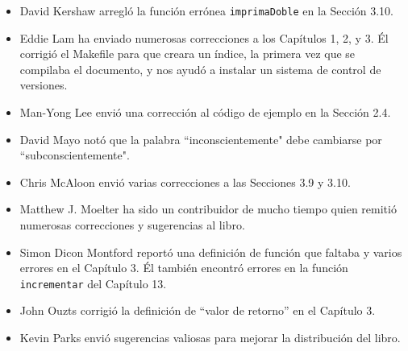 \begin{itemize}
\item David Kershaw arregló la función errónea \texttt{imprimaDoble} en 
la Sección 3.10.


\item Eddie Lam ha enviado numerosas correcciones a los Capítulos 1, 2, y 3.  Él
corrigió el Makefile para que creara un índice, la primera vez
que se compilaba el documento, y  nos ayudó a instalar un sistema
de control de versiones.


\item Man-Yong Lee envió una corrección al código de ejemplo en la
Sección 2.4.  


\item David Mayo notó que la palabra ``inconscientemente"
debe cambiarse por  ``subconscientemente".


\item Chris McAloon envió varias correcciones a las Secciones 3.9 y 3.10.


\item Matthew J. Moelter ha sido un contribuidor de mucho tiempo quien remitió 
numerosas correcciones y sugerencias al libro.  


\item Simon Dicon Montford reportó una definición de función que faltaba y 
varios errores en el Capítulo 3.  Él también encontró errores en la
función \texttt{incrementar} del Capítulo 13.


\item John Ouzts corrigió la definición de ``valor de retorno'' en el
Capítulo 3.


\item Kevin Parks envió  sugerencias valiosas para mejorar la distribución del libro.



\end{itemize}
